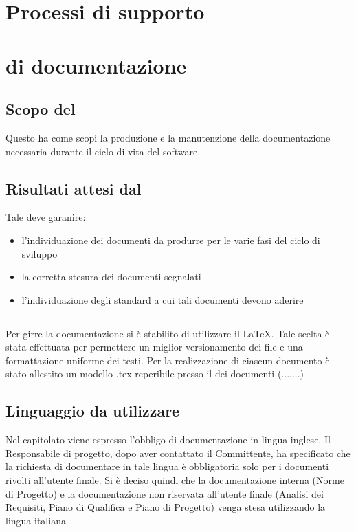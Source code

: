 \section{Processi di supporto}
\section{ di documentazione}
\subsection{Scopo del }
Questo  ha come scopi la produzione e la manutenzione della documentazione necessaria durante il ciclo di vita del software.
\subsection{Risultati attesi dal }
Tale  deve garanire:
\begin{itemize}
\item l'individuazione dei documenti da produrre per le varie fasi del ciclo di sviluppo
\item la corretta stesura dei documenti segnalati
\item l'individuazione degli standard a cui tali documenti devono aderire
\end{itemize}
  \subsection{}
  Per girre la documentazione si è stabilito di utilizzare il  \LaTeX. Tale scelta è stata effettuata per permettere un miglior versionamento dei file e una formattazione uniforme dei testi.
  Per la realizzazione di ciascun documento \`e stato allestito un modello .tex reperibile presso il  dei documenti (.......)

  \subsection{Linguaggio da utilizzare}
  Nel capitolato viene espresso l'obbligo di documentazione in lingua inglese. Il Responsabile di progetto, dopo aver contattato il Committente, ha specificato che la richiesta di documentare in tale lingua è obbligatoria solo per i documenti rivolti all'utente finale. Si è deciso quindi che la documentazione interna (Norme di Progetto) e la documentazione non riservata all'utente finale (Analisi dei Requisiti, Piano di Qualifica e Piano di Progetto) venga stesa utilizzando la lingua italiana  
  
